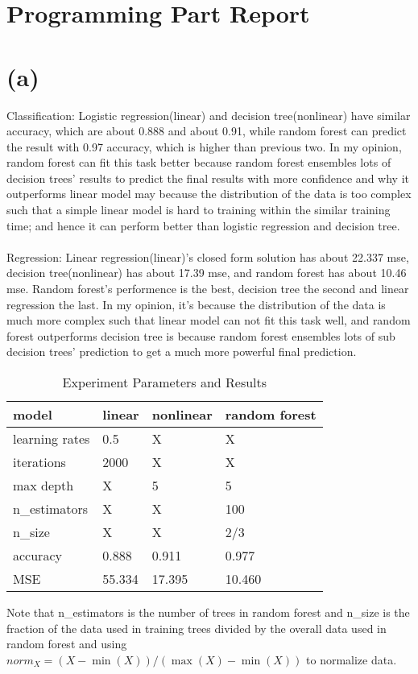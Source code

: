 \documentclass[12pt,a4paper]{article}
\begin{document}
\section*{Programming Part Report}
\section*{(a)}
Classification: Logistic regression(linear) and decision tree(nonlinear) have similar accuracy, which are about 0.888 and about 0.91, while random forest
can predict the result with 0.97 accuracy, which is higher than previous two. In my opinion, random forest can fit this task better because random forest ensembles
lots of decision trees' results to predict the final results with more confidence and why it outperforms linear model may because the distribution of the data is too complex such
that a simple linear model is hard to training within the similar training time;
and hence it can perform better than logistic regression and decision tree.\\
\\
Regression: Linear regression(linear)'s closed form solution has about 22.337 mse, decision tree(nonlinear) has about 17.39 mse, and random forest has about 10.46 mse.
Random forest's performence is the best, decision tree the second and linear regression the last. In my opinion, it's because the distribution of the data is much more complex
such that linear model can not fit this task well, and random forest outperforms decision tree is because random forest ensembles lots of sub decision trees' prediction to
get a much more powerful final prediction.\\
\begin{table}[htbp]
    \centering
    \caption{Experiment Parameters and Results}
    \label{label1}
    \begin{tabular}[t]{llll}
    \hline
    model & linear & nonlinear & random forest \\
    \hline
    learning rates & 0.5   & X   & X \\
    iterations & 2000   & X   & X \\
    max depth & X   & 5   & 5 \\
    n\_estimators & X   & X   & 100 \\
    n\_size & X   & X   & 2/3 \\
    accuracy & 0.888   & 0.911   & 0.977 \\
    MSE & 55.334   & 17.395   & 10.460 \\
    \hline
    \end{tabular}
\end{table}
\begin{center}
Note that n\_estimators is the number of trees in random forest and n\_size is the fraction of the data used in training trees divided by the overall data used in random forest and using
$norm_X = (X - \min(X)) / (\max(X) - \min(X))$ to normalize data.
\end{center}
\end{document}
